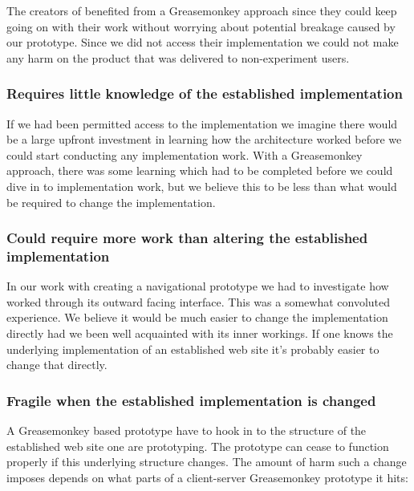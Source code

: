 The creators of \urort{} benefited from a Greasemonkey approach since they
could keep going on with their work without worrying about potential breakage
caused by our prototype. Since we did not access their implementation we could
not make any harm on the product that was delivered to non-experiment users.

\subsubsection{Requires little knowledge of the established implementation}

If we had been permitted access to the \urort{} implementation we imagine
there would be a large upfront investment in learning how the \urort{}
architecture worked before we could start conducting any implementation work.
With a Greasemonkey approach, there was some learning which had to be
completed before we could dive in to implementation work, but we believe this
to be less than what would be required to change the \urort{} implementation.

\subsubsection{Could require more work than altering the established
  implementation}

In our work with creating a navigational prototype we had to investigate how
\urort{} worked through its outward facing interface. This was a somewhat
convoluted experience.
We believe it would be much easier to change the \urort{} implementation
directly had we been well acquainted with its inner workings.
If one knows the underlying implementation of an established web site it's
probably easier to change that directly.

\subsubsection{Fragile when the established implementation is changed}

A Greasemonkey based prototype have to hook in to the structure of the
established web site one are prototyping. The prototype can cease to function
properly if this underlying structure changes. The amount of harm such a
change imposes depends on what parts of a client-server Greasemonkey prototype
it hits:

